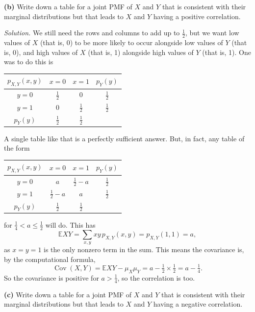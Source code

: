 \documentclass[
  a4paper,
]{book}
\theoremstyle{definition}
\theoremstyle{definition}
\theoremstyle{definition}
\theoremstyle{definition}
\theoremstyle{remark}
\begin{document}
\textbf{(b)} Write down a table for a joint PMF of \(X\) and \(Y\) that is consistent with their marginal distributions but that leads to \(X\) and \(Y\) having a positive correlation.

\begin{myanswers}
\emph{Solution.}
We still need the rows and columns to add up to \(\frac12\), but we want low values of \(X\) (that is, 0) to be more likely to occur alongside low values of \(Y\) (that is, 0), and high values of \(X\) (that is, 1) alongside high values of \(Y\) (that is, 1). One was to do this is

\begin{longtable}[]{@{}cccc@{}}
\toprule()
\(p_{X,Y}(x,y)\) & \(x = 0\) & \(x = 1\) & \(p_Y(y)\) \\
\midrule()
\endhead
\(y = 0\) & \(\frac12\) & \(0\) & \(\frac12\) \\
\(y = 1\) & \(0\) & \(\frac12\) & \(\frac12\) \\
\(p_Y(y)\) & \(\frac12\) & \(\frac12\) & \\
\bottomrule()
\end{longtable}

A single table like that is a perfectly sufficient answer. But, in fact, any table of the form

\begin{longtable}[]{@{}cccc@{}}
\toprule()
\(p_{X,Y}(x,y)\) & \(x = 0\) & \(x = 1\) & \(p_Y(y)\) \\
\midrule()
\endhead
\(y = 0\) & \(a\) & \(\frac12 - a\) & \(\frac12\) \\
\(y = 1\) & \(\frac12 - a\) & \(a\) & \(\frac12\) \\
\(p_Y(y)\) & \(\frac12\) & \(\frac12\) & \\
\bottomrule()
\end{longtable}

for \(\frac14 < a \leq \frac12\) will do. This has
\[ \mathbb EXY = \sum_{x,y} xy\, p_{X,Y}(x,y) = p_{X,Y}(1, 1) = a , \]
as \(x = y = 1\) is the only nonzero term in the sum. This means the covariance is, by the computational formula,
\[ \operatorname{Cov}(X,Y) = \mathbb EXY - \mu_X \mu_Y = a - \tfrac12 \times \tfrac12 = a - \tfrac14 . \]
So the covariance is positive for \(a > \frac14\), so the correlation is too.

\end{myanswers}

\textbf{(c)} Write down a table for a joint PMF of \(X\) and \(Y\) that is consistent with their marginal distributions but that leads to \(X\) and \(Y\) having a negative correlation.
\end{document}
